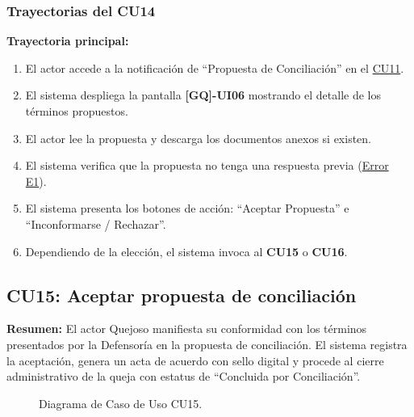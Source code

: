 \begin{appendices}
\subsubsection{Trayectorias del CU14}
\textbf{Trayectoria principal:}
\begin{enumerate}[nosep]
    \item El actor accede a la notificación de ``Propuesta de Conciliación'' en el \hyperlink{anexo:casos_uso}{CU11}.
    \item El sistema despliega la pantalla \textbf{[GQ]-UI06} mostrando el detalle de los términos propuestos.
    \item El actor lee la propuesta y descarga los documentos anexos si existen.
    \item El sistema verifica que la propuesta no tenga una respuesta previa (\hyperlink{err:E19}{Error E1}).
    \item El sistema presenta los botones de acción: ``Aceptar Propuesta'' e ``Inconformarse / Rechazar''.
    \item Dependiendo de la elección, el sistema invoca al \textbf{CU15} o \textbf{CU16}.
\end{enumerate}

\newpage

\subsection{CU15: Aceptar propuesta de conciliación}

\textbf{Resumen:} 
El actor Quejoso manifiesta su conformidad con los términos presentados por la Defensoría en la propuesta de conciliación. El sistema registra la aceptación, genera un acta de acuerdo con sello digital y procede al cierre administrativo de la queja con estatus de ``Concluida por Conciliación''.

\begin{figure}[htbp]
    \centering
    \figCUquince
    \caption{Diagrama de Caso de Uso CU15.}
    \label{fig:cu15}
\end{figure}


\end{appendices}
